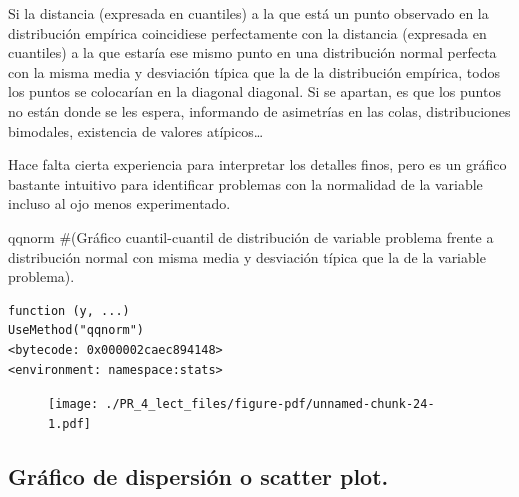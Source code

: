 \documentclass[
  letterpaper,
  DIV=11,
  numbers=noendperiod]{scrreprt}
\newenvironment{Shaded}{\begin{snugshade}}{\end{snugshade}}
\newcommand{\CommentTok}[1]{\textcolor[rgb]{0.37,0.37,0.37}{#1}}
\newcommand{\FunctionTok}[1]{\textcolor[rgb]{0.28,0.35,0.67}{#1}}
\newcommand{\NormalTok}[1]{\textcolor[rgb]{0.00,0.23,0.31}{#1}}
\newcommand{\SpecialCharTok}[1]{\textcolor[rgb]{0.37,0.37,0.37}{#1}}
\begin{document}
Si la distancia (expresada en cuantiles) a la que está un punto
observado en la distribución empírica coincidiese perfectamente con la
distancia (expresada en cuantiles) a la que estaría ese mismo punto en
una distribución normal perfecta con la misma media y desviación típica
que la de la distribución empírica, todos los puntos se colocarían en la
diagonal diagonal. Si se apartan, es que los puntos no están donde se
les espera, informando de asimetrías en las colas, distribuciones
bimodales, existencia de valores atípicos\ldots{}

Hace falta cierta experiencia para interpretar los detalles finos, pero
es un gráfico bastante intuitivo para identificar problemas con la
normalidad de la variable incluso al ojo menos experimentado.

\begin{Shaded}
\begin{Highlighting}[]
\NormalTok{qqnorm }\CommentTok{\#(Gráfico cuantil{-}cuantil de distribución de variable problema frente a distribución normal con misma media y desviación típica que la de la variable problema).}
\end{Highlighting}
\end{Shaded}

\begin{verbatim}
function (y, ...) 
UseMethod("qqnorm")
<bytecode: 0x000002caec894148>
<environment: namespace:stats>
\end{verbatim}

\begin{Shaded}
\end{Shaded}

\begin{figure}[H]

{\centering \texttt{[image: ./PR\_4\_lect\_files/figure-pdf/unnamed-chunk-24-1.pdf]}

}

\end{figure}

\hypertarget{gruxe1fico-de-dispersiuxf3n-o-scatter-plot.}{%
\subsection{Gráfico de dispersión o scatter
plot.}\label{gruxe1fico-de-dispersiuxf3n-o-scatter-plot.}}
\end{document}
